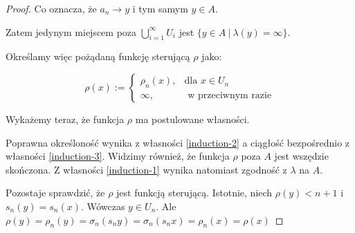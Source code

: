 \begin{thm}
\begin{proof}
  Co oznacza, że $a_n \rightarrow y$ i tym samym $y \in A$.
  
  Zatem jedynym miejscem poza $\bigcup_{i=1}^\infty U_i$ jest $\{y \in A\ |\ \lambda(y) = \infty\}$.
  
  Określamy więc pożądaną funkcję sterującą $\rho$ jako:
  
  $$\rho(x) := 
    \begin{cases}
      \rho_n(x),&\mbox{dla } x \in U_n \\
      \infty,&\mbox{ w przeciwnym razie}
    \end{cases}
  $$
  
  Wykażemy teraz, że funkcja $\rho$ ma postulowane własności.
  
  Poprawna określoność wynika z własności \ref{induction-2} a ciągłość bezpośrednio z własności \ref{induction-3}. Widzimy również, że funkcja $\rho$ poza $A$ jest wszędzie skończona. Z własności \ref{induction-1} wynika natomiast zgodność z $\lambda$ na $A$.
  
  Pozostaje sprawdzić, że $\rho$ jest funkcją sterującą. Istotnie, niech $\rho(y) < n+1$ i $s_n(y) = s_n(x)$. Wówczas $y \in U_n$. Ale $\rho(y) = \rho_n(y) = \sigma_n(s_n y) = \sigma_n(s_n x) = \rho_n(x) = \rho(x)$
\end{proof}
\end{thm}

